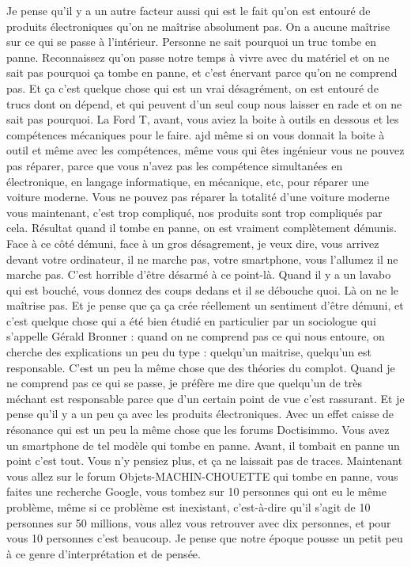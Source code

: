 \begin{small}
Je pense qu'il y a un autre facteur aussi qui est le fait qu'on est entouré de produits électroniques qu'on ne maîtrise absolument pas. On a aucune maîtrise sur ce qui se passe à l'intérieur. Personne ne sait pourquoi un truc tombe en panne. Reconnaissez qu'on passe notre temps à vivre avec du matériel et on ne sait pas pourquoi ça tombe en panne, et c'est énervant parce qu'on ne comprend pas. Et ça c'est quelque chose qui est un vrai désagrément, on est entouré de trucs dont on dépend, et qui peuvent d'un seul coup nous laisser en rade et on ne sait pas pourquoi. 
La Ford T, avant, vous aviez la boite à outils en dessous et les compétences mécaniques pour le faire. ajd même si on vous donnait la boite à outil et même avec les compétences, même vous qui êtes ingénieur vous ne pouvez pas réparer, parce que vous n'avez pas les compétence simultanées en  électronique, en langage informatique, en mécanique, etc, pour réparer une voiture moderne. Vous ne pouvez pas réparer la totalité d'une voiture moderne vous maintenant, c'est trop compliqué, nos produits sont trop compliqués par cela. Résultat quand il tombe en panne, on est vraiment complètement démunis. Face à ce côté démuni, face à un gros désagrement, je veux dire, vous arrivez devant votre ordinateur, il ne marche pas, votre smartphone, vous l'allumez il ne marche pas. C'est horrible d'être désarmé à ce point-là. Quand il y a un lavabo qui est bouché, vous donnez des coups dedans et il se débouche quoi. Là on ne le maîtrise pas. Et je pense que ça ça crée réellement un sentiment d'être démuni, et c'est quelque chose qui a été bien étudié en particulier par un sociologue qui s'appelle Gérald Bronner : quand on ne comprend pas ce qui nous entoure, on cherche des explications un peu du type : quelqu'un maitrise, quelqu'un est responsable. C'est un peu la même chose que des théories du complot. Quand je ne comprend pas ce qui se passe, je préfère me dire que quelqu'un de très méchant est responsable parce que d'un certain point de vue c'est rassurant. Et je pense qu'il y a un peu ça avec les produits électroniques. Avec un effet caisse de résonance qui est un peu la même chose que les forums Doctisimmo. Vous avez un smartphone de tel modèle qui tombe en panne. Avant, il tombait en panne un point c'est tout. Vous n'y pensiez plus, et ça ne laissait pas de traces. Maintenant vous allez sur le forum Objets-MACHIN-CHOUETTE qui tombe en panne, vous faites une recherche Google, vous tombez sur 10 personnes qui ont eu le même problème, même si ce problème est inexistant, c'est-à-dire qu'il s'agit de 10 personnes sur 50 millions, vous allez vous retrouver avec dix personnes, et pour vous 10 personnes c'est beaucoup. Je pense que notre époque pousse un petit peu à ce genre d'interprétation et de pensée. 


\end{small}
